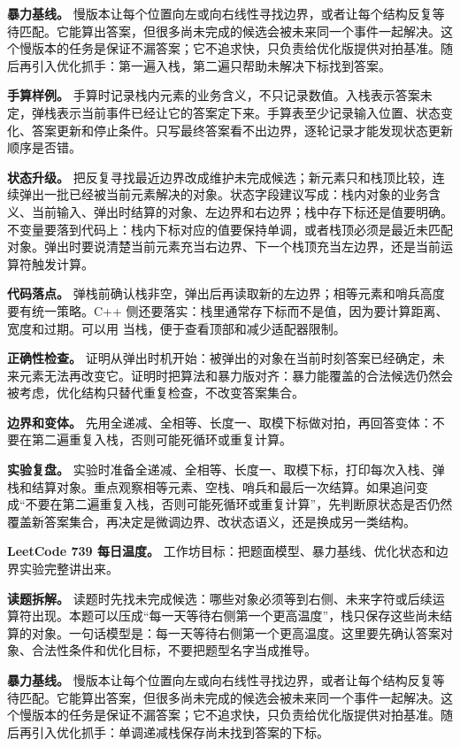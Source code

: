 \textbf{暴力基线。} 慢版本让每个位置向左或向右线性寻找边界，或者让每个结构反复等待匹配。它能算出答案，但很多尚未完成的候选会被未来同一个事件一起解决。这个慢版本的任务是保证不漏答案；它不追求快，只负责给优化版提供对拍基准。随后再引入优化抓手：第一遍入栈，第二遍只帮助未解决下标找到答案。

\textbf{手算样例。} 手算时记录栈内元素的业务含义，不只记录数值。入栈表示答案未定，弹栈表示当前事件已经让它的答案定下来。手算表至少记录输入位置、状态变化、答案更新和停止条件。只写最终答案看不出边界，逐轮记录才能发现状态更新顺序是否错。

\textbf{状态升级。} 把反复寻找最近边界改成维护未完成候选；新元素只和栈顶比较，连续弹出一批已经被当前元素解决的对象。状态字段建议写成：栈内对象的业务含义、当前输入、弹出时结算的对象、左边界和右边界；栈中存下标还是值要明确。不变量要落到代码上：栈内下标对应的值要保持单调，或者栈顶必须是最近未匹配对象。弹出时要说清楚当前元素充当右边界、下一个栈顶充当左边界，还是当前运算符触发计算。

\textbf{代码落点。} 弹栈前确认栈非空，弹出后再读取新的左边界；相等元素和哨兵高度要有统一策略。C++ 侧还要落实：栈里通常存下标而不是值，因为要计算距离、宽度和过期。可以用  当栈，便于查看顶部和减少适配器限制。

\textbf{正确性检查。} 证明从弹出时机开始：被弹出的对象在当前时刻答案已经确定，未来元素无法再改变它。证明时把算法和暴力版对齐：暴力能覆盖的合法候选仍然会被考虑，优化结构只替代重复检查，不改变答案集合。

\textbf{边界和变体。} 先用全递减、全相等、长度一、取模下标做对拍，再回答变体：不要在第二遍重复入栈，否则可能死循环或重复计算。

\textbf{实验复盘。} 实验时准备全递减、全相等、长度一、取模下标，打印每次入栈、弹栈和结算对象。重点观察相等元素、空栈、哨兵和最后一次结算。如果追问变成“不要在第二遍重复入栈，否则可能死循环或重复计算”，先判断原状态是否仍然覆盖新答案集合，再决定是微调边界、改状态语义，还是换成另一类结构。

\noindent\textbf{LeetCode 739 每日温度。} 工作坊目标：把题面模型、暴力基线、优化状态和边界实验完整讲出来。

\textbf{读题拆解。} 读题时先找未完成候选：哪些对象必须等到右侧、未来字符或后续运算符出现。本题可以压成“每一天等待右侧第一个更高温度”，栈只保存这些尚未结算的对象。一句话模型是：每一天等待右侧第一个更高温度。这里要先确认答案对象、合法性条件和优化目标，不要把题型名字当成推导。

\textbf{暴力基线。} 慢版本让每个位置向左或向右线性寻找边界，或者让每个结构反复等待匹配。它能算出答案，但很多尚未完成的候选会被未来同一个事件一起解决。这个慢版本的任务是保证不漏答案；它不追求快，只负责给优化版提供对拍基准。随后再引入优化抓手：单调递减栈保存尚未找到答案的下标。

